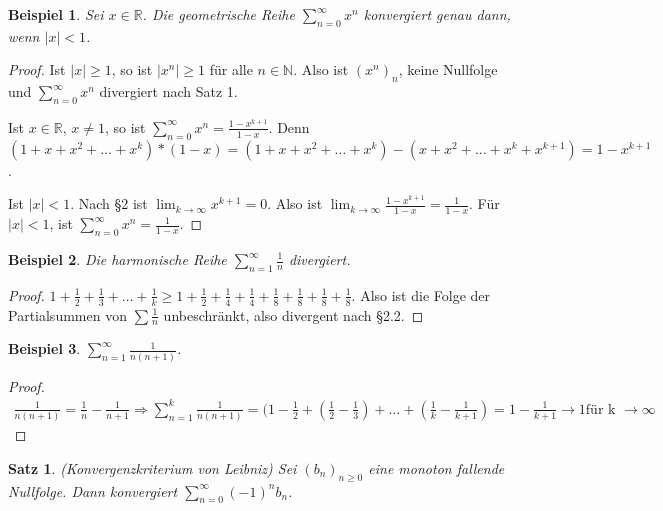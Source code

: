 \documentclass[a4paper,10pt]{article}
\newtheorem{example}{Beispiel}
\newtheorem{satz}{Satz}
\begin{document}
\begin{example}
 Sei $x \in \mathbb{R}$.
 Die geometrische Reihe $\sum_{n = 0}^\infty x^n$ konvergiert genau dann, wenn $|x| < 1$.
\end{example}

\begin{proof}
 Ist $|x| \ge 1$, so ist $|x^n| \ge 1$ für alle $n \in \mathbb{N}$.
 Also ist $(x^n)_n$, keine Nullfolge und $\sum_{n = 0}^\infty x^n$ divergiert nach Satz 1.
 
 Ist $x \in \mathbb{R}$, $x \ne 1$, so ist $\sum_{n = 0}^\infty x^n = \frac{1 - x^{k + 1}}{1 - x}$.
 Denn $(1 + x + x^2 + \dots + x^k) * (1 - x) = (1 + x + x^2 + \dots + x^k) - (x + x^2 + \dots + x^k + x^{k + 1}) = 1 - x^{k + 1}$.
 
 Ist $|x| < 1$.
 Nach §2 ist $\lim_{k \rightarrow \infty} x^{k + 1} = 0$.
 Also ist $\lim_{k \rightarrow \infty} \frac{1 - x^{k + 1}}{1 - x} = \frac{1}{1 - x}$.
 Für $|x| < 1$, ist $\sum_{n = 0}^\infty x^n = \frac{1}{1 - x}$.
\end{proof}

\begin{example}
 Die harmonische Reihe $\sum_{n = 1}^\infty \frac{1}{n}$ divergiert.
\end{example}

\begin{proof}
 $1 + \frac{1}{2} + \frac{1}{3} + \dots + \frac{1}{k} \ge 1 + \frac{1}{2} + \frac{1}{4} + \frac{1}{4} + \frac{1}{8} + \frac{1}{8} + \frac{1}{8} + \frac{1}{8}$.
 Also ist die Folge der Partialsummen von $\sum \frac{1}{n}$ unbeschränkt, also divergent nach §2.2.
\end{proof}

\begin{example}
 $\sum_{n = 1}^\infty \frac{1}{n(n + 1)}$.
\end{example}

\begin{proof}
 \begin{align*}
  \frac{1}{n(n + 1)} = \frac{1}{n} - \frac{1}{n + 1} \Rightarrow \sum_{n = 1}^k \frac{1}{n(n + 1)} = (1 - \frac{1}{2} + (\frac{1}{2} - \frac{1}{3}) + \dots + (\frac{1}{k} - \frac{1}{k + 1}) = 1 - \frac{1}{k + 1} \rightarrow 1 \text{für k }\rightarrow \infty
 \end{align*}
\end{proof}

\begin{satz}
 (Konvergenzkriterium von Leibniz)
 Sei $(b_n)_{n \ge 0}$ eine monoton fallende Nullfolge.
 Dann konvergiert $\sum_{n = 0}^\infty (-1)^n b_n$.
\end{satz}
\end{document}
